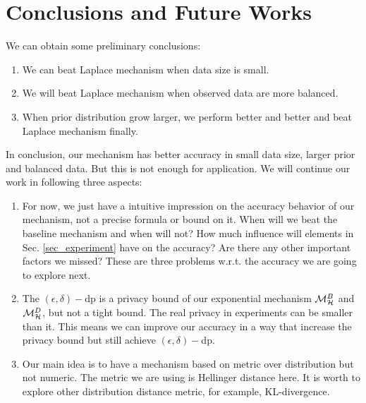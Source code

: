 \documentclass[sigconf, anonymous]{acmart}
\begin{document}


\section{Conclusions and Future Works}
We can obtain some preliminary conclusions:
\begin{enumerate}
  \item We can beat Laplace mechanism when data size is small.
  \item We will beat Laplace mechanism when observed data are more
balanced.
  \item When prior distribution grow larger, we perform better and
better and beat Laplace mechanism finally.
\end{enumerate}

In conclusion, our mechanism has better accuracy in small data size,
larger prior and balanced data. But this is not enough for
application. We will continue our work in following three aspects:
\begin{enumerate}
  \item For now, we just have a intuitive impression on the accuracy
behavior of our mechanism, not a precise formula or bound on it.  When
will we beat the baseline mechanism and when will not? How much
influence will elements in Sec. \ref{sec_experiment} have on the
accuracy? Are there any other important factors we missed? These are
three problems w.r.t. the accuracy we are going to explore next.
  \item The $(\epsilon, \delta)-$dp is a privacy bound of our
exponential mechanism $\mathcal{M}^{B}_{\mathcal{H}}$ and $\mathcal{M}^{D}_{\mathcal{H}}$, but not a tight
bound. The real privacy in experiments can be smaller than it. This
means we can improve our accuracy in a way that increase the privacy
bound but still achieve $(\epsilon, \delta)-$dp.
  \item Our main idea is to have a mechanism based on metric over
distribution but not numeric. The metric we are using is Hellinger
distance here. It is worth to explore other distribution distance
metric, for example, KL-divergence.
\end{enumerate}





\end{document}
